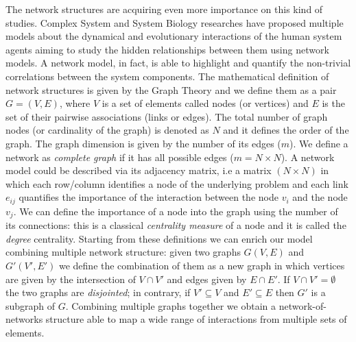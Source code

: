 \documentclass{standalone}
\begin{document}
The network structures are acquiring even more importance on this kind of studies.
Complex System and System Biology researches have proposed multiple models about the dynamical and evolutionary interactions of the human system agents aiming to study the hidden relationships between them using network models.
A network model, in fact, is able to highlight and quantify the non-trivial correlations between the system components.
The mathematical definition of network structures is given by the Graph Theory and we define them as a pair $G = (V, E)$, where $V$ is a set of elements called nodes (or vertices) and $E$ is the set of their pairwise associations (links or edges).
The total number of graph nodes (or cardinality of the graph) is denoted as $N$ and it defines the order of the graph.
The graph dimension is given by the number of its edges ($m$).
We define a network as \emph{complete graph} if it has all possible edges ($m = N \times N$).
A network model could be described via its adjacency matrix, i.e a matrix $(N\times N)$ in which each row/column identifies a node of the underlying problem and each link $e_{ij}$ quantifies the importance of the interaction between the node $v_i$ and the node $v_j$.
We can define the importance of a node into the graph using the number of its connections: this is a classical \emph{centrality measure} of a node and it is called the \emph{degree} centrality.
Starting from these definitions we can enrich our model combining multiple network structure: given two graphs $G(V, E)$ and $G'(V', E')$ we define the combination of them as a new graph in which vertices are given by the intersection of $V\cap V'$ and edges given by $E\cap E'$.
If $V\cap V'=\emptyset$ the two graphs are \emph{disjointed}; in contrary, if $V'\subseteq V$ and $E'\subseteq E$ then $G'$ is a subgraph of $G$.
Combining multiple graphs together we obtain a network-of-networks structure able to map a wide range of interactions from multiple sets of elements.
\end{document}
